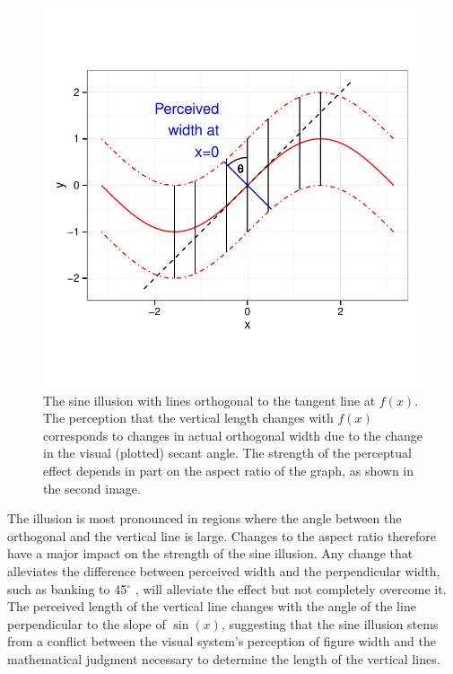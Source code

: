 \documentclass[12pt]{article}\usepackage[]{graphicx}\usepackage[]{color}
\begin{document}
\begin{figure}[h!tbp]
\includegraphics[width=.8\linewidth, keepaspectratio=TRUE]{fig-transform-illustration}
\centering
\caption{\label{fig:OrthogonalWidth} The sine illusion with lines orthogonal to the tangent line at $f(x)$. The perception that the vertical length changes with $f(x)$ corresponds to changes in actual orthogonal width due to the change in the visual (plotted) secant angle. The strength of the perceptual effect depends in part on the aspect ratio of the graph, as shown in the second image.
}
\end{figure}
The illusion is most pronounced in regions where the angle between the orthogonal  and the vertical line is large. Changes to the aspect ratio therefore have a major impact on the strength of the sine illusion. Any change that alleviates the difference between perceived width and the perpendicular width, such as banking to 45$^\circ$ \citep{cleveland:88}, will alleviate the effect but not completely overcome it. 
The perceived length of the vertical line changes with the angle of the line perpendicular to the slope of $\sin(x)$, suggesting that the sine illusion stems from a conflict between the visual system's perception of figure width and the mathematical judgment necessary to determine the length of the vertical lines. 
\end{document}
